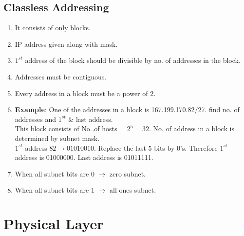 \documentclass[a4paper,oneside]{book}
\begin{document}
\section{Classless Addressing}
\begin{enumerate}
\item It consists of only blocks.
\item IP address given along with mask.
\item $1^{st}$ address of the block should be divisible by no. of addresses in the block.
\item Addresses must be contiguous.
\item Every address in a block must be a power of 2.
\item \textbf{Example}: One of the addresses in a block is 167.199.170.82/27. find no. of addresses and $1^{st}$ \& last address.\\
This block consists of No .of hosts = $2^5 = 32$. No. of address in a block is determined by subnet mask.\\
$1^{st}$ address $82 \to 01010010$. Replace the last 5 bits by 0's. Therefore $1^{st}$ address is 01000000. Last address is 01011111.
\item When all subnet bits are 0 $\to$ zero subnet.
\item When all subnet bits are 1 $\to$ all ones subnet.
\end{enumerate}
\chapter{Physical Layer}
\end{document}
